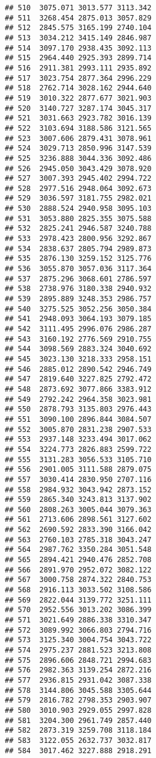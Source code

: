 \documentclass[
]{article}
\begin{document}
\begin{verbatim}
## 510  3075.071 3013.577 3113.342
## 511  3268.454 2875.013 3057.829
## 512  2845.575 3165.199 2740.104
## 513  3034.212 3415.149 2846.987
## 514  3097.170 2938.435 3092.113
## 515  2964.440 2925.393 2899.714
## 516  2911.381 2993.111 2935.892
## 517  3023.754 2877.364 2996.229
## 518  2762.714 3028.162 2944.640
## 519  3010.322 2877.677 3021.903
## 520  3140.727 3287.174 3045.317
## 521  3031.663 2923.782 3016.139
## 522  3103.694 3188.586 3121.565
## 523  3007.606 2879.431 3078.961
## 524  3029.713 2850.996 3147.539
## 525  3236.888 3044.336 3092.486
## 526  2945.050 3043.429 3078.920
## 527  3007.393 2945.402 2994.722
## 528  2977.516 2948.064 3092.673
## 529  3036.597 3181.755 2982.021
## 530  2888.524 2940.958 3095.103
## 531  3053.880 2825.355 3075.588
## 532  2825.241 2946.587 3240.788
## 533  2978.423 2800.956 3292.867
## 534  2838.637 2805.794 2989.873
## 535  2876.130 3259.152 3125.776
## 536  3055.870 3057.036 3117.364
## 537  2875.296 3068.601 2786.597
## 538  2738.976 3180.338 2940.932
## 539  2895.889 3248.353 2986.757
## 540  3275.525 3052.256 3050.384
## 541  2948.093 3064.193 3079.185
## 542  3111.495 2996.076 2986.287
## 543  3160.192 2776.569 2910.755
## 544  3098.569 2883.324 3040.692
## 545  3023.130 3218.333 2958.151
## 546  2885.012 2890.542 2946.749
## 547  2819.640 3227.825 2792.472
## 548  2873.692 3077.866 3383.912
## 549  2792.242 2964.358 3023.981
## 550  2878.793 3135.803 2976.443
## 551  3090.100 2896.844 3084.507
## 552  3005.870 2831.238 2907.533
## 553  2937.148 3233.494 3017.062
## 554  3224.773 2826.883 2599.722
## 555  3131.283 3056.533 3105.710
## 556  2901.005 3111.588 2879.075
## 557  3030.414 2830.950 2707.116
## 558  2984.932 3043.942 2873.152
## 559  2865.340 3243.813 3137.902
## 560  2808.263 3005.044 3079.363
## 561  2713.606 2898.561 3127.602
## 562  2690.592 2833.390 3166.042
## 563  2760.103 2785.318 3043.247
## 564  2987.762 3350.284 3051.548
## 565  2894.421 2940.476 2852.708
## 566  2891.970 2952.072 3082.122
## 567  3000.758 2874.322 2840.753
## 568  2916.113 3033.502 3108.586
## 569  2822.044 3139.772 3251.111
## 570  2952.556 3013.202 3086.399
## 571  3021.649 2886.338 3310.347
## 572  3089.992 3066.803 2794.716
## 573  3125.340 3004.754 3043.722
## 574  2975.237 2881.523 3213.808
## 575  2896.606 2848.721 2994.683
## 576  2982.363 3139.254 2872.216
## 577  2936.815 2931.042 3087.338
## 578  3144.806 3045.588 3305.644
## 579  2816.782 2798.353 2903.907
## 580  3010.903 2929.055 2997.828
## 581  3204.300 2961.749 2857.440
## 582  2873.319 3259.708 3118.184
## 583  3122.055 2632.737 3032.817
## 584  3017.462 3227.888 2918.291

\end{verbatim}
\end{document}
